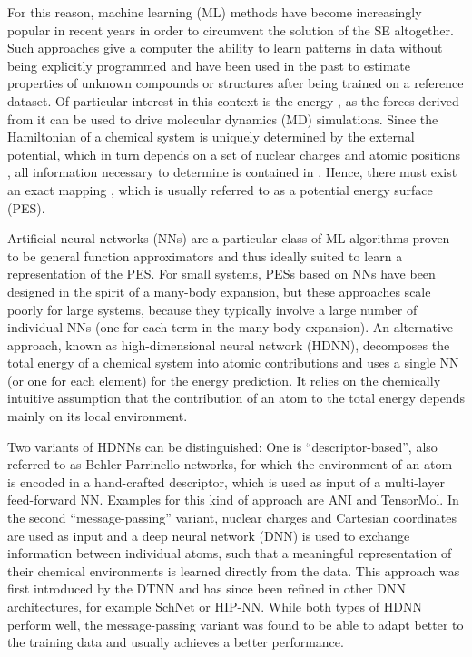 \documentclass[12pt]{article}
\begin{document}
For this reason, machine learning (ML) methods have become
increasingly popular in recent years in order to circumvent the
solution of the SE altogether. Such approaches give a computer the
ability to learn patterns in data without being explicitly
programmed\cite{samuel2000some} and have been used in the past to
estimate properties of unknown compounds or structures after being
trained on a reference
dataset.\cite{rupp2012fast,montavon2013machine,hansen2013assessment,hansen2015machine}
Of particular interest in this context is the energy , as the
forces derived from it can be used to drive molecular dynamics (MD)
simulations. Since the Hamiltonian of a chemical system is uniquely
determined by the external potential, which in turn depends on a set
of nuclear charges  and atomic positions ,
all information necessary to determine  is contained in . Hence, there must exist an exact mapping , which is usually referred to as a potential
energy surface (PES).

Artificial neural networks
(NNs)\cite{mcculloch1943logical,kohonen1988introduction,abdi1994neural,bishop1995neural,clark1999neural,ripley2007pattern,haykin2009neural}
are a particular class of ML algorithms proven to be general function
approximators\cite{gybenko1989approximation,hornik1991approximation}
and thus ideally suited to learn a representation of the PES. For
small systems, PESs based on NNs have been designed in the spirit of a
many-body
expansion,\cite{manzhos2006random,manzhos2007using,malshe2009development}
but these approaches scale poorly for large systems, because they
typically involve a large number of individual NNs (one for each term
in the many-body expansion). An alternative approach, known as
high-dimensional neural network (HDNN),\cite{behler2007generalized}
decomposes the total energy of a chemical system into atomic
contributions and uses a single NN (or one for each element) for the
energy prediction. It relies on the chemically intuitive assumption
that the contribution of an atom to the total energy depends mainly on
its local environment.

Two variants of HDNNs can be distinguished: One is
``descriptor-based'', also referred to as Behler-Parrinello
networks,\cite{behler2007generalized} for which the environment of an
atom is encoded in a hand-crafted
descriptor,\cite{behler2011atom,khorshidi2016amp,artrith2017efficient,unke2018reactive}
which is used as input of a multi-layer feed-forward NN. Examples for
this kind of approach are ANI\cite{smith2017ani} and
TensorMol.\cite{yao2018tensormol} In the second
``message-passing''\cite{gilmer2017neural} variant, nuclear charges
and Cartesian coordinates are used as input and a deep neural network
(DNN) is used to exchange information between individual atoms, such
that a meaningful representation of their chemical environments is
learned directly from the data. This approach was first introduced by
the DTNN\cite{schutt2017quantum} and has since been refined in other
DNN architectures, for example SchNet\cite{schutt2017schnet} or
HIP-NN.\cite{lubbers2018hierarchical} While both types of HDNN perform
well, the message-passing variant was found to be able to adapt better
to the training data and usually achieves a better
performance.\cite{schutt2018quantum}
\end{document}
